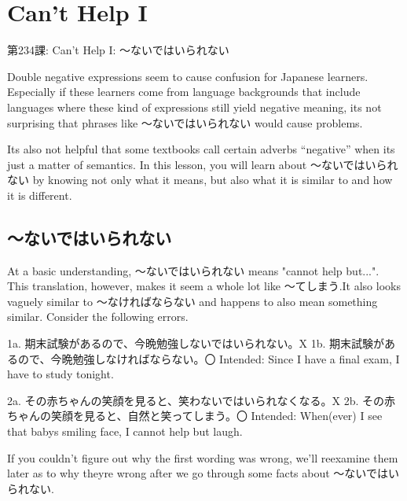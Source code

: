     
\chapter{Can't Help I}

\begin{center}
\begin{Large}
第234課: Can't Help I: ～ないではいられない 
\end{Large}
\end{center}
 
\par{ Double negative expressions seem to cause confusion for Japanese learners. Especially if these learners come from language backgrounds that include languages where these kind of expressions still yield negative meaning, it\textquotesingle s not surprising that phrases like ～ないではいられない would cause problems. }

\par{ It\textquotesingle s also not helpful that some textbooks call certain adverbs “negative” when it\textquotesingle s just a matter of semantics. In this lesson, you will learn about ～ないではいられない by knowing not only what it means, but also what it is similar to and how it is different. }
      
\section{～ないではいられない}
 
\par{ At a basic understanding, ～ないではいられない means "cannot help but\dothyp{}\dothyp{}\dothyp{}". This translation, however, makes it seem a whole lot like ～てしまう.It also looks vaguely similar to ～なければならない and happens to also mean something similar. Consider the following errors. }

\par{1a. 期末試験があるので、今晩勉強しないではいられない。X \hfill\break
1b. 期末試験があるので、今晩勉強しなければならない。〇 \hfill\break
Intended: Since I have a final exam, I have to study tonight. }

\par{2a. その赤ちゃんの笑顔を見ると、笑わないではいられなくなる。X \hfill\break
2b. その赤ちゃんの笑顔を見ると、自然と笑ってしまう。〇 \hfill\break
Intended: When(ever) I see that baby\textquotesingle s smiling face, I cannot help but laugh. }

\par{ If you couldn't figure out why the first wording was wrong, we'll reexamine them later as to why they\textquotesingle re wrong after we go through some facts about ～ないではいられない. }

